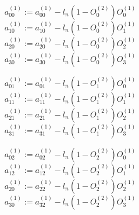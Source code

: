 \documentclass[12pt,a4paper, margin=1in]{article}
\begin{document}
\begin{equation*}
    a^{(1)}_{00} := a^{(1)}_{00} - l_n(1-O^{(2)}_0)O^{(1)}_0
\end{equation*}
\begin{equation*}
    a^{(1)}_{10} := a^{(1)}_{10} - l_n(1-O^{(2)}_0)O^{(1)}_1
\end{equation*}
\begin{equation*}
    a^{(1)}_{20} := a^{(1)}_{20} - l_n(1-O^{(2)}_0)O^{(1)}_2
\end{equation*}
\begin{equation*}
    a^{(1)}_{30} := a^{(1)}_{30} - l_n(1-O^{(2)}_0)O^{(1)}_3
\end{equation*}

\begin{equation*}
    a^{(1)}_{01} := a^{(1)}_{01} - l_n(1-O^{(2)}_1)O^{(1)}_0
\end{equation*}
\begin{equation*}
    a^{(1)}_{11} := a^{(1)}_{11} - l_n(1-O^{(2)}_1)O^{(1)}_1
\end{equation*}
\begin{equation*}
    a^{(1)}_{21} := a^{(1)}_{21} - l_n(1-O^{(2)}_1)O^{(1)}_2
\end{equation*}
\begin{equation*}
    a^{(1)}_{31} := a^{(1)}_{31} - l_n(1-O^{(2)}_1)O^{(1)}_3
\end{equation*}

\begin{equation*}
    a^{(1)}_{02} := a^{(1)}_{02} - l_n(1-O^{(2)}_2)O^{(1)}_0
\end{equation*}
\begin{equation*}
    a^{(1)}_{12} := a^{(1)}_{12} - l_n(1-O^{(2)}_2)O^{(1)}_1
\end{equation*}
\begin{equation*}
    a^{(1)}_{20} := a^{(1)}_{22} - l_n(1-O^{(2)}_2)O^{(1)}_2
\end{equation*}
\begin{equation*}
    a^{(1)}_{30} := a^{(1)}_{32} - l_n(1-O^{(2)}_2)O^{(1)}_3
\end{equation*}
\end{document}
